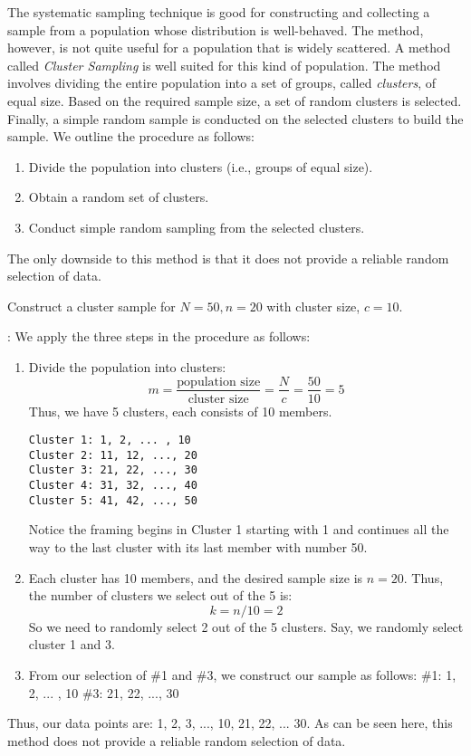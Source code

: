 The systematic sampling technique is good for constructing and collecting a sample from a population whose distribution is well-behaved. The method, however, is not quite useful for a population that is widely scattered. A method called {\it{Cluster Sampling}} is well suited for this kind of population. The method involves dividing the entire population into a set of groups, called {\it{clusters}}, of equal size. Based on the required sample size, a set of random clusters is selected. Finally, a simple random sample is conducted on the selected clusters to build the sample. We outline the procedure as follows: 
\begin{enumerate}
\item Divide the population into clusters (i.e., groups of equal size). 
\item Obtain a random set of clusters.
\item Conduct simple random sampling from the selected clusters.
\end{enumerate}
The only downside to this method is that it does not provide a reliable random selection of data.  
 
\begin{example}  \label{cluster-sample-001}     
Construct a cluster sample for $N= 50, n=20$ with cluster size, $c=10$. 

: We apply the three steps in the procedure as follows:  
\begin{enumerate} 
\item Divide the population into clusters: 
\[ m = \frac{\text{population size}}{\text{cluster size}} = \frac{N}{c} = \frac{50}{10} = 5 \] 
Thus, we have 5 clusters, each consists of 10 members.
\begin{verbatim}  
Cluster 1: 1, 2, ... , 10 
Cluster 2: 11, 12, ..., 20 
Cluster 3: 21, 22, ..., 30 
Cluster 4: 31, 32, ..., 40 
Cluster 5: 41, 42, ..., 50   
\end{verbatim} 
Notice the framing begins in Cluster 1 starting with 1 and continues all the way to the last cluster with its last member with number 50. 
\item Each cluster has 10 members, and the desired sample size is $n = 20$. Thus, the number of clusters we select out of the 5 is: 
\[ k = n/10 = 2 \]
So we need to randomly select 2 out of the 5 clusters. Say, we randomly select cluster 1 and 3. 

\item From our selection of \#1 and \#3, we construct our sample as follows:
\#1: 1, 2, ... , 10 
\#3: 21, 22, ..., 30 
\end{enumerate} 
Thus, our data points are: 1, 2, 3, ..., 10, 21, 22, ... 30. As can be seen here, this method does not provide a reliable random selection of data.
\end{example} 

